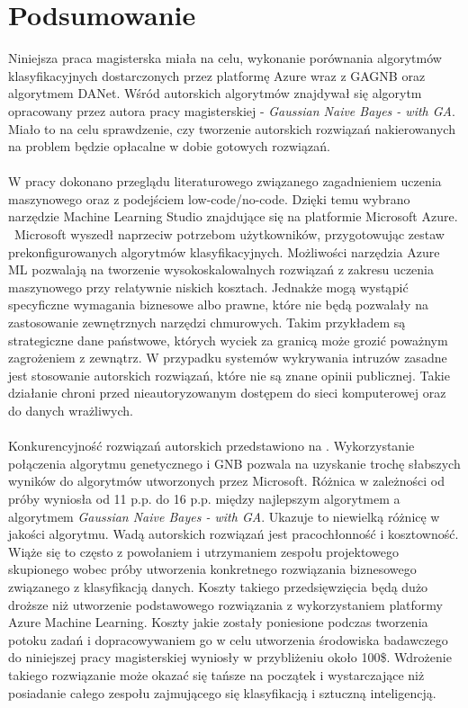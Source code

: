 \chapter{Podsumowanie}
Niniejsza praca magisterska miała na celu, wykonanie porównania algorytmów klasyfikacyjnych dostarczonych przez platformę Azure wraz z GAGNB oraz algorytmem DANet. Wśród autorskich algorytmów znajdywał się algorytm opracowany przez autora pracy magisterskiej - \textit{Gaussian Naive Bayes - with GA}. Miało to na celu sprawdzenie, czy tworzenie autorskich rozwiązań nakierowanych na problem będzie opłacalne w dobie gotowych rozwiązań.
\\ \\
W pracy dokonano przeglądu literaturowego związanego zagadnieniem uczenia maszynowego oraz z podejściem low-code/no-code. Dzięki temu wybrano narzędzie Machine Learning Studio znajdujące się na platformie Microsoft Azure. \ Microsoft wyszedł naprzeciw potrzebom użytkowników, przygotowując zestaw prekonfigurowanych algorytmów klasyfikacyjnych. Możliwości narzędzia Azure ML pozwalają na tworzenie wysokoskalowalnych rozwiązań z zakresu uczenia maszynowego przy relatywnie niskich kosztach. Jednakże mogą wystąpić specyficzne wymagania biznesowe albo prawne, które nie będą pozwalały na zastosowanie zewnętrznych narzędzi chmurowych. Takim przykładem są strategiczne dane państwowe, których wyciek za granicą może grozić poważnym zagrożeniem z zewnątrz. W przypadku systemów wykrywania intruzów zasadne jest stosowanie autorskich rozwiązań, które nie są znane opinii publicznej. Takie działanie chroni przed nieautoryzowanym dostępem do sieci komputerowej oraz do danych wrażliwych.
\\ \\
Konkurencyjność rozwiązań autorskich przedstawiono na . Wykorzystanie połączenia algorytmu genetycznego i GNB pozwala na uzyskanie trochę słabszych wyników do algorytmów utworzonych przez Microsoft. Różnica w zależności od próby wyniosła od 11 p.p. do 16 p.p. między najlepszym algorytmem a algorytmem \textit{Gaussian Naive Bayes - with GA}. Ukazuje to niewielką różnicę w jakości algorytmu. Wadą autorskich rozwiązań jest pracochłonność i kosztowność. Wiąże się to często z powołaniem i utrzymaniem zespołu projektowego skupionego wobec próby utworzenia konkretnego rozwiązania biznesowego związanego z klasyfikacją danych. Koszty takiego przedsięwzięcia będą dużo droższe niż utworzenie podstawowego rozwiązania z wykorzystaniem platformy Azure Machine Learning. Koszty jakie zostały poniesione podczas tworzenia potoku zadań i dopracowywaniem go w celu utworzenia środowiska badawczego do niniejszej pracy magisterskiej wyniosły w przybliżeniu około 100\$. Wdrożenie takiego rozwiązanie może okazać się tańsze na początek i wystarczające niż posiadanie całego zespołu zajmującego się klasyfikacją i sztuczną inteligencją.
